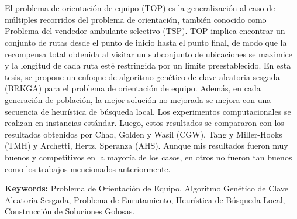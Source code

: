 
\chapter*{\tituloAbstractEs}

\noindent El problema de orientación de equipo (TOP) es la generalización al caso de múltiples recorridos del problema de orientación, también conocido como Problema del vendedor ambulante selectivo (TSP). TOP implica encontrar un conjunto de rutas desde el punto de inicio hasta el punto final, de modo que la recompensa total obtenida al visitar un subconjunto de ubicaciones se maximice y la longitud de cada ruta esté restringida por un límite preestablecido. En esta tesis, se propone un enfoque de algoritmo genético de clave aleatoria sesgada (BRKGA) para el problema de orientación de equipo. Además, en cada generación de población, la mejor solución no mejorada se mejora con una secuencia de heurística de búsqueda local. Los experimentos computacionales se realizan en instancias estándar. Luego, estos resultados se compararon con los resultados obtenidos por Chao, Golden y Wasil (CGW), Tang y Miller-Hooks (TMH) y Archetti, Hertz, Speranza (AHS). Aunque mis resultados fueron muy buenos y competitivos en la mayoría de los casos, en otros no fueron tan buenos como los trabajos mencionados anteriormente.

\bigskip

\noindent\textbf{Keywords:} Problema de Orientación de Equipo, Algoritmo Genético de Clave Aleatoria Sesgada, Problema de Enrutamiento, Heurística de Búsqueda Local, Construcción de Soluciones Golosas.